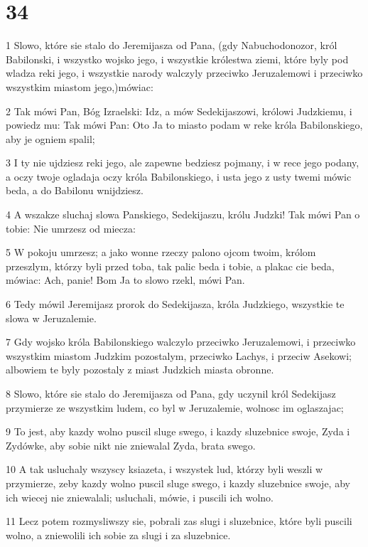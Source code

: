 \chapter{34}

\par 1 Slowo, które sie stalo do Jeremijasza od Pana, (gdy Nabuchodonozor, król Babilonski, i wszystko wojsko jego, i wszystkie królestwa ziemi, które byly pod wladza reki jego, i wszystkie narody walczyly przeciwko Jeruzalemowi i przeciwko wszystkim miastom jego,)mówiac:
\par 2 Tak mówi Pan, Bóg Izraelski: Idz, a mów Sedekijaszowi, królowi Judzkiemu, i powiedz mu: Tak mówi Pan: Oto Ja to miasto podam w reke króla Babilonskiego, aby je ogniem spalil;
\par 3 I ty nie ujdziesz reki jego, ale zapewne bedziesz pojmany, i w rece jego podany, a oczy twoje ogladaja oczy króla Babilonskiego, i usta jego z usty twemi mówic beda, a do Babilonu wnijdziesz.
\par 4 A wszakze sluchaj slowa Panskiego, Sedekijaszu, królu Judzki! Tak mówi Pan o tobie: Nie umrzesz od miecza:
\par 5 W pokoju umrzesz; a jako wonne rzeczy palono ojcom twoim, królom przeszlym, którzy byli przed toba, tak palic beda i tobie, a plakac cie beda, mówiac: Ach, panie! Bom Ja to slowo rzekl, mówi Pan.
\par 6 Tedy mówil Jeremijasz prorok do Sedekijasza, króla Judzkiego, wszystkie te slowa w Jeruzalemie.
\par 7 Gdy wojsko króla Babilonskiego walczylo przeciwko Jeruzalemowi, i przeciwko wszystkim miastom Judzkim pozostalym, przeciwko Lachys, i przeciw Asekowi; albowiem te byly pozostaly z miast Judzkich miasta obronne.
\par 8 Slowo, które sie stalo do Jeremijasza od Pana, gdy uczynil król Sedekijasz przymierze ze wszystkim ludem, co byl w Jeruzalemie, wolnosc im oglaszajac;
\par 9 To jest, aby kazdy wolno puscil sluge swego, i kazdy sluzebnice swoje, Zyda i Zydówke, aby sobie nikt nie zniewalal Zyda, brata swego.
\par 10 A tak usluchaly wszyscy ksiazeta, i wszystek lud, którzy byli weszli w przymierze, zeby kazdy wolno puscil sluge swego, i kazdy sluzebnice swoje, aby ich wiecej nie zniewalali; usluchali, mówie, i puscili ich wolno.
\par 11 Lecz potem rozmysliwszy sie, pobrali zas slugi i sluzebnice, które byli puscili wolno, a zniewolili ich sobie za slugi i za sluzebnice.
